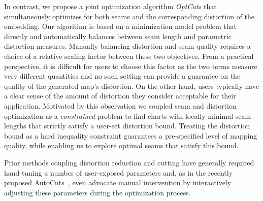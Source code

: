 In contrast, we propose a joint optimization algorithm {\em OptCuts} that simultaneously optimizes for both 
seams and the corresponding distortion of the embedding.
Our algorithm is based on a minimization model problem that directly and automatically balances between seam length and parametric distortion measures. Manually balancing distortion and seam quality requires a choice of a relative scaling factor between these two objectives. From a practical perspective, it is difficult for users to choose this factor as the two terms measure very different quantities and no such setting can provide a guarantee on the quality of the generated map's distortion. 
On the other hand, users typically have a clear sense of the amount of distortion they consider acceptable for their application. Motivated by this observation we   coupled seam and distortion optimization as a \emph{constrained} problem to find charts with locally minimal seam lengths that strictly satisfy a user-set distortion bound. Treating the distortion bound as a hard inequality constraint guarantees a pre-specified level of mapping quality, while enabling us to explore optimal seams that satisfy this bound. %

Prior methods coupling distortion reduction and cutting have generally required hand-tuning a number of user-exposed parameters and, as in the recently proposed AutoCuts~\cite{Poranne2017Autocuts}, even advocate manual intervention by interactively adjusting these parameters during the optimization process. 

